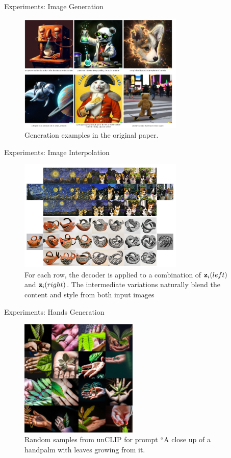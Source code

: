 \documentclass[aspectratio=169, 9pt]{beamer}
\theoremstyle{definition}
\begin{document}
\begin{frame}{Experiments: Image Generation}

  \begin{figure}[h]
    \centering
    \includegraphics[width=0.70\textwidth]{./pic/dalle-e2 examples.png}
    \caption{Generation examples in the original paper.}
  \end{figure}
\end{frame}
\begin{frame}{Experiments: Image Interpolation}
  \begin{figure}[h]
    \centering
    \includegraphics[width=0.70\textwidth]{./pic/dalle-image_interp.png}
    \caption{For each row, the decoder is applied to a combination of
    ${\mathbf{z}}_i(left)$ and ${\mathbf{z}}_i(right)$. The intermediate variations naturally
  blend the content and style from both input images}
  \end{figure}
\end{frame}
\begin{frame}{Experiments: Hands Generation}
  \begin{figure}[h]
    \centering
    \includegraphics[width=0.5\textwidth]{./pic/hand-dalle2.png}
    \caption{Random samples from unCLIP for prompt “A close up of a handpalm with leaves growing from it.}
  \end{figure}
\end{frame}
\end{document}
